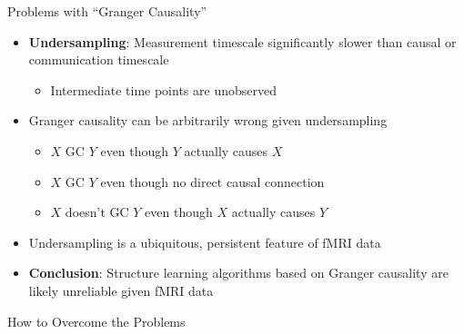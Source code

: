 \documentclass[final,hyperref={pdfpagelabels=false}]{beamer}
\begin{document}
\begin{frame}{}
\begin{columns}[t]
\begin{column}{.48\linewidth}
\begin{block}{\Large Problems with ``Granger Causality''}
\begin{itemize}
          \item \textbf{Undersampling}: Measurement timescale significantly slower than
          causal or communication timescale 
          \begin{itemize} \item Intermediate time points are unobserved \end{itemize}
          
          \item Granger causality can be arbitrarily wrong given undersampling
          \begin{itemize}
            \item $X$ GC $Y$ even though $Y$ actually causes $X$
            \item $X$ GC $Y$ even though no direct causal connection
            \item $X$ doesn't GC $Y$ even though $X$ actually causes $Y$
            \end{itemize}
          
          \item Undersampling is a ubiquitous, persistent feature of fMRI data
          
          \item \textbf{Conclusion}: Structure learning algorithms based on Granger causality
          are likely unreliable given fMRI data
          \end{itemize}
        \end{block}

        \begin{block}{\Large How to Overcome the Problems}
          \begin{minipage}{0.5\textwidth}
            \LinesNumberedHidden
\end{minipage}
\end{block}
\end{column}
\end{columns}
\end{frame}
\end{document}
